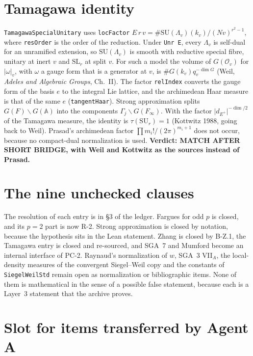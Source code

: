 \documentclass[11pt]{article}
\newcommand{\lean}[1]{\nolinkurl{#1}}
\theoremstyle{definition}
\begin{document}
\section{Tamagawa identity}\label{sec:tam}

\lean{TamagawaSpecialUnitary} uses \lean{locFactor} $E\,r\,v=\#\mathrm{SU}(\Lambda_v)(k_v)/(Nv)^{r^2-1}$, where \lean{resOrder} is the order of the reduction. Under \lean{Unr E}, every $\Lambda_v$ is self-dual for an unramified extension, so $\mathrm{SU}(\Lambda_v)$ is smooth with reductive special fibre, unitary at inert $v$ and $\mathrm{SL}_r$ at split $v$. For such a model the volume of $G(\mathcal O_v)$ for $\lvert\omega\rvert_v$, with $\omega$ a gauge form that is a generator at $v$, is $\#G(k_v)q_v^{-\dim G}$ (Weil, \emph{Adeles and Algebraic Groups}, Ch.~II). The factor \lean{relIndex} converts the gauge form of the basis $e$ to the integral Lie lattice, and the archimedean Haar measure is that of the same $e$ (\lean{tangentHaar}). Strong approximation splits $G(F)\backslash G(\mathbb A)$ into the components $\Gamma_j\backslash G(F_\infty)$. With the factor $\lvert d_{E^+}\rvert^{-\dim/2}$ of the Tamagawa measure, the identity is $\tau(\mathrm{SU}_r)=1$ (Kottwitz 1988, going back to Weil). Prasad's archimedean factor $\prod m_i!/(2\pi)^{m_i+1}$ does not occur, because no compact-dual normalization is used. \textbf{Verdict: MATCH AFTER SHORT BRIDGE, with Weil and Kottwitz as the sources instead of Prasad.}

\section{The nine unchecked clauses}\label{sec:nine}

The resolution of each entry is in §3 of the ledger. Fargues for odd $p$ is closed, and its $p=2$ part is now R-2. Strong approximation is closed by notation, because the hypothesis sits in the Lean statement. Zhang is closed by B-Z.1, the Tamagawa entry is closed and re-sourced, and SGA~7 and Mumford become an internal interface of PC-2. Raynaud's normalization of $w$, SGA~3 VII$_A$, the local-density measures of the convergent Siegel--Weil copy and the constants of \lean{SiegelWeilStd} remain open as normalization or bibliographic items. None of them is mathematical in the sense of a possible false statement, because each is a Layer~3 statement that the archive proves.

\section{Slot for items transferred by Agent A}\label{sec:slot}
\end{document}
